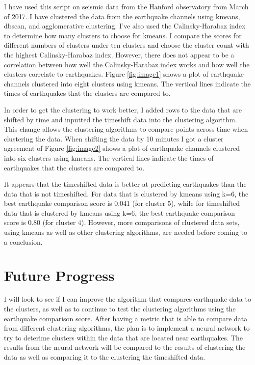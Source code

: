 \documentclass[colorlinks=true,pdfstartview=FitV,linkcolor=blue,
            citecolor=red,urlcolor=magenta]{ligodoc}
\begin{document}
\par I have used this script on seismic data from the Hanford observatory from March of 2017. I have clustered the data from the earthquake channels using kmeans, dbscan, and agglomerative clustering. I've also used the Calinsky-Harabaz index to determine how many clusters to choose for kmeans. I compare the scores for different numbers of clusters under ten clusters and choose the cluster count with the highest Calinsky-Harabaz index. However, there does not appear to be a correlation between how well the Calinsky-Harabaz index works and how well the clusters correlate to earthquakes. Figure \ref{fig:image1} shows a plot of earthquake channels clustered into eight clusters using kmeans. The vertical lines indicate the times of earthquakes that the clusters are compared to.

\par In order to get the clustering to work better, I added rows to the data that are shifted by time and inputted the timeshift data into the clustering algorithm. This change allows the clustering algorithms to compare points across time when clustering the data. When shifting the data by 10 minutes I got a cluster agreement of Figure \ref{fig:image2} shows a plot of earthquake channels clustered into six clusters using kmeans. The vertical lines indicate the times of earthquakes that the clusters are compared to.

\par It appears that the timeshifted data is better at predicting earthquakes than the data that is not timeshifted. For data that is clustered by kmeans using k=6, the best earthquake comparison score is 0.041 (for cluster 5), while for timeshifted data that is clustered by kmeans using k=6, the best earthquake comparison score is 0.80 (for cluster 4). However, more comparisons of clustered data sets, using kmeans as well as other clustering algorithms, are needed before coming to a conclusion. 
 
\section{Future Progress}

\indent

\par I will look to see if I can improve the algorithm that compares earthquake data to the clusters, as well as to continue to test the clustering algorithms using the earthquake comparison score.  After having a metric that is able to compare data from different clustering algorithms, the plan is to implement a neural network to try to deterime clusters within the data that are located near earthquakes. The results from the neural network will be compared to the results of clustering the data as well as comparing it to the clustering the timeshifted data.   
\end{document}
